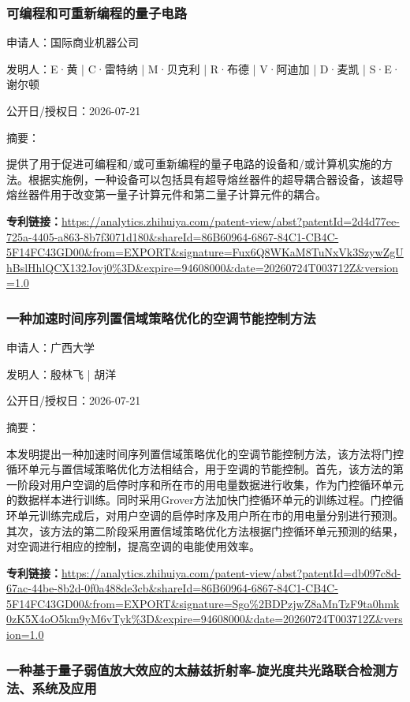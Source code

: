\documentclass[12pt,a4paper]{ctexart}
\begin{document}
\subsubsection{ 可编程和可重新编程的量子电路 }

申请人：国际商业机器公司

发明人：E·黄 | C·雷特纳 | M·贝克利 | R·布德 | V·阿迪加 | D·麦凯 | S·E·谢尔顿

公开日/授权日：2026-07-21

摘要：

提供了用于促进可编程和/或可重新编程的量子电路的设备和/或计算机实施的方法。根据实施例，一种设备可以包括具有超导熔丝器件的超导耦合器设备，该超导熔丝器件用于改变第一量子计算元件和第二量子计算元件的耦合。

\noindent\textbf{专利链接：}\url{https://analytics.zhihuiya.com/patent-view/abst?patentId=2d4d77ee-725a-4405-a863-8b7f3071d180&shareId=86B60964-6867-84C1-CB4C-5F14FC43GD00&from=EXPORT&signature=Fux6Q8WKaM8TuNxVk3SzywZgUhBslHhlQCX132Jovj0%3D&expire=94608000&date=20260724T003712Z&version=1.0}

\subsubsection{ 一种加速时间序列置信域策略优化的空调节能控制方法 }

申请人：广西大学

发明人：殷林飞 | 胡洋

公开日/授权日：2026-07-21

摘要：

本发明提出一种加速时间序列置信域策略优化的空调节能控制方法，该方法将门控循环单元与置信域策略优化方法相结合，用于空调的节能控制。首先，该方法的第一阶段对用户空调的启停时序和所在市的用电量数据进行收集，作为门控循环单元的数据样本进行训练。同时采用Grover方法加快门控循环单元的训练过程。门控循环单元训练完成后，对用户空调的启停时序及用户所在市的用电量分别进行预测。其次，该方法的第二阶段采用置信域策略优化方法根据门控循环单元预测的结果，对空调进行相应的控制，提高空调的电能使用效率。

\noindent\textbf{专利链接：}\url{https://analytics.zhihuiya.com/patent-view/abst?patentId=db097c8d-67ac-44be-8b2d-0f0a488de3cb&shareId=86B60964-6867-84C1-CB4C-5F14FC43GD00&from=EXPORT&signature=Sgo%2BDPzjwZ8aMnTzF9ta0hmk0zK5X4oO5km9yM6vTyk%3D&expire=94608000&date=20260724T003712Z&version=1.0}

\subsubsection{ 一种基于量子弱值放大效应的太赫兹折射率-旋光度共光路联合检测方法、系统及应用 }
\end{document}
